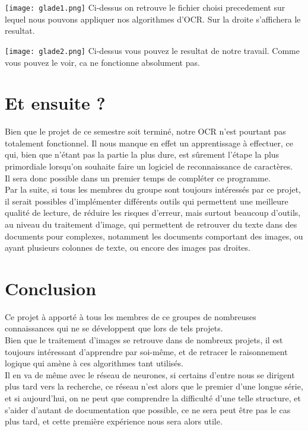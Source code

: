 \documentclass[14pt]{article}
\begin{document}
\newpage
\begin{center}
\texttt{[image: glade1.png]}
Ci-dessus on retrouve le fichier choisi precedement sur lequel nous pouvons appliquer nos algorithmes d'OCR. Sur la droite s'affichera le resultat.
\end{center}
\newpage

\begin{center}
\texttt{[image: glade2.png]}
Ci-dessus vous pouvez le resultat de notre travail. Comme vous pouvez le voir, ca ne fonctionne absolument pas. 
\end{center}

\newpage
\section{Et ensuite ?}
Bien que le projet de ce semestre soit terminé, notre OCR n'est pourtant pas totalement fonctionnel. Il nous manque en effet un apprentissage à effectuer, ce qui, bien que n'étant pas la partie la plus dure, est sûrement l'étape la plus primordiale lorsqu'on souhaite faire un logiciel de reconnaissance de caractères.\\
\indent Il sera donc possible dans un premier temps de compléter ce programme.\\
Par la suite, si tous les membres du groupe sont toujours intéressés par ce projet, il serait possibles d'implémenter différents outils qui permettent une meilleure qualité de lecture, de réduire les risques d'erreur, mais surtout beaucoup d'outils, au niveau du traitement d'image, qui permettent de retrouver du texte dans des documents pour complexes, notamment les documents comportant des images, ou ayant plusieurs colonnes de texte, ou encore des images pas droites.
\newpage
\section{Conclusion}
Ce projet à apporté à tous les membres de ce groupes de nombreuses connaissances qui ne se développent que lors de tels projets.\\
\indent Bien que le traitement d'images se retrouve dans de nombreux projets, il est toujours intéressant d'apprendre par soi-même, et de retracer le raisonnement logique qui amène à ces algorithmes tant utilisés.\\
Il en va de même avec le réseau de neurones, si certains d'entre nous se dirigent plus tard vers la recherche, ce réseau n'est alors que le premier d'une longue série, et si aujourd'hui, on ne peut que comprendre la difficulté d'une telle structure, et s'aider d'autant de documentation que possible, ce ne sera peut être pas le cas plus tard, et cette première expérience nous sera alors utile.
\newpage
\end{document}
